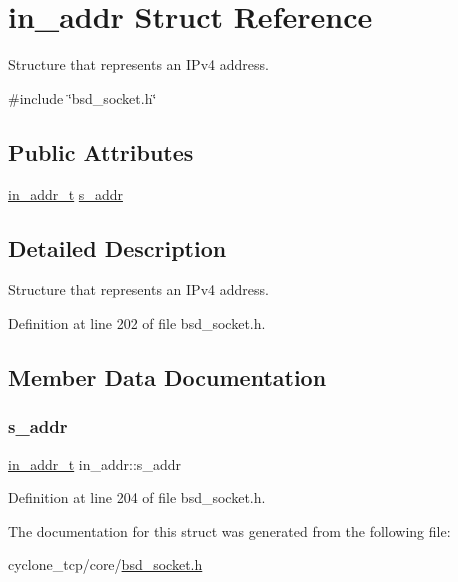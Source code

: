 \hypertarget{structin__addr}{}\section{in\+\_\+addr Struct Reference}
\label{structin__addr}


Structure that represents an I\+Pv4 address.  




{\ttfamily \#include \char`\"{}bsd\+\_\+socket.\+h\char`\"{}}

\subsection*{Public Attributes}
\begin{DoxyCompactItemize}
\item 
\hyperlink{bsd__socket_8h_a98b38134a62f24554da0ffcabde8062c}{in\+\_\+addr\+\_\+t} \hyperlink{structin__addr_a3b6ef12385f913cc23a199205d9bf858}{s\+\_\+addr}
\end{DoxyCompactItemize}


\subsection{Detailed Description}
Structure that represents an I\+Pv4 address. 

Definition at line 202 of file bsd\+\_\+socket.\+h.



\subsection{Member Data Documentation}
\mbox{\label{structin__addr_a3b6ef12385f913cc23a199205d9bf858}} 
\subsubsection{\texorpdfstring{s\+\_\+addr}{s\_addr}}
{\footnotesize\ttfamily \hyperlink{bsd__socket_8h_a98b38134a62f24554da0ffcabde8062c}{in\+\_\+addr\+\_\+t} in\+\_\+addr\+::s\+\_\+addr}



Definition at line 204 of file bsd\+\_\+socket.\+h.



The documentation for this struct was generated from the following file\+:\begin{DoxyCompactItemize}
\item 
cyclone\+\_\+tcp/core/\hyperlink{bsd__socket_8h}{bsd\+\_\+socket.\+h}\end{DoxyCompactItemize}
